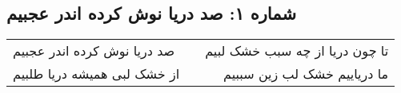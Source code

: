 \begin{center}
\section*{شماره ۱: صد دریا نوش کرده اندر عجبیم}
\label{sec:001}
\begin{longtable}{l p{0.5cm} r}
صد دریا نوش کرده اندر عجبیم
&&
تا چون دریا از چه سبب خشک لبیم
\\
از خشک لبی همیشه دریا طلبیم
&&
ما دریاییم خشک لب زین سببیم
\\
\end{longtable}
\end{center}
